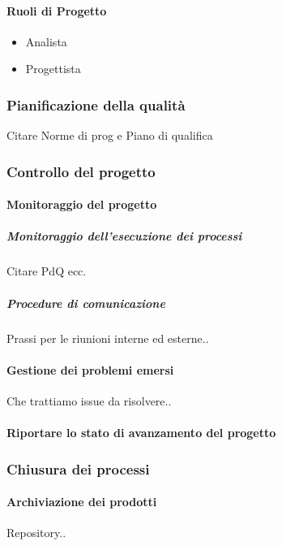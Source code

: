 			\paragraph{Ruoli di Progetto} %
			\begin{itemize}
				\item Analista
				\item Progettista
				
			\end{itemize}
		
		\subsubsection{Pianificazione della qualità}
		Citare Norme di prog e Piano di qualifica
		
		\subsubsection{Controllo del progetto}
		
			\paragraph{Monitoraggio del progetto}
			
			\subparagraph{Monitoraggio dell'esecuzione dei processi}
			Citare PdQ ecc.
			
			\subparagraph{Procedure di comunicazione}
    		Prassi per le riunioni interne ed esterne..
    		
    		
    		\paragraph{Gestione dei problemi emersi}
    		Che trattiamo issue da risolvere..
    		
    		\paragraph{Riportare lo stato di avanzamento del progetto}
    		
    	\subsubsection{Chiusura dei processi}	
    	
    		\paragraph{Archiviazione dei prodotti}
    		Repository..
    		
